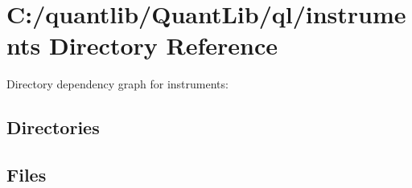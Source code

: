 \section{C\+:/quantlib/\+Quant\+Lib/ql/instruments Directory Reference}
\label{dir_525e98820fff7af514b8df9283f9035f}
Directory dependency graph for instruments\+:
\subsection*{Directories}
\begin{DoxyCompactItemize}
\end{DoxyCompactItemize}
\subsection*{Files}

